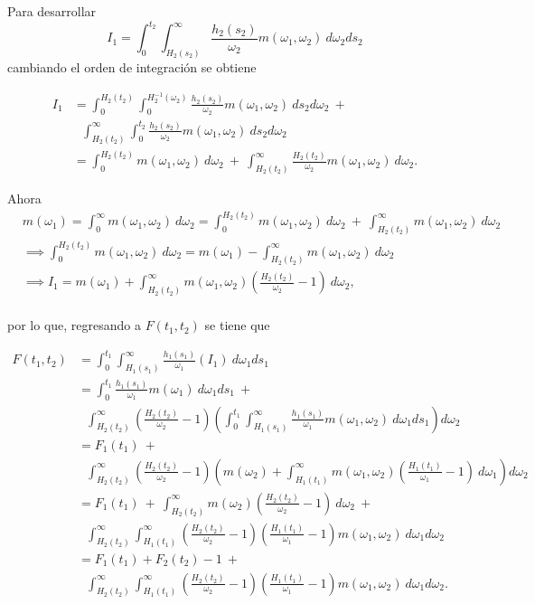 \documentclass[11pt,a4paper]{article}
\begin{document}
\begin{appendices}
Para desarrollar $$I_1 = \int_0^{t_2} \int_{H_2(s_2)}^\infty \frac{h_2(s_2)}{\omega_2} m(\omega_1, \omega_2) \ d\omega_2 ds_2$$ cambiando el orden de integración se obtiene

\begin{align*}
I_1 &= \int_0^{H_2(t_2)}\int_0^{H_2^{-1}(\omega_2)} \frac{h_2(s_2)}{\omega_2}m(\omega_1, \omega_2) \ ds_2 d\omega_2 \ +\\
& \ \ \ \int_{H_2(t_2)}^\infty \int_0^{t_2} \frac{h_2(s_2)}{\omega_2}m(\omega_1, \omega_2) \ ds_2 d\omega_2\\
&= \int_0^{H_2(t_2)} m(\omega_1, \omega_2) \ d\omega_2 \ + \ \int_{H_2(t_2)}^\infty \frac{H_2(t_2)}{\omega_2}m(\omega_1, \omega_2) \ d\omega_2.
\end{align*}

Ahora
\begin{align*}
&m(\omega_1) = \int_0^\infty m(\omega_1, \omega_2) \ d\omega_2 = \int_0^{H_2(t_2)} m(\omega_1, \omega_2) \ d\omega_2 \ + \ \int_{H_2(t_2)}^\infty m(\omega_1, \omega_2) \ d\omega_2\\
&\implies \int_0^{H_2(t_2)} m(\omega_1, \omega_2) \ d\omega_2 = m(\omega_1) - \int_{H_2(t_2)}^\infty m(\omega_1, \omega_2) \ d\omega_2\\
&\implies I_1 = m(\omega_1) + \int_{H_2(t_2)}^\infty m(\omega_1, \omega_2) \left( \frac{H_2(t_2)}{\omega_2}-1\right) \ d\omega_2,\\
\end{align*}

por lo que, regresando a $F(t_1, t_2)$ se tiene que

\begin{align*}
F(t_1, t_2) &= \int_0^{t_1} \int_{H_1(s_1)}^\infty \frac{h_1(s_1)}{\omega_1}\left( I_1 \right) \ d\omega_1 ds_1\\
&= \int_0^{t_1} \frac{h_1(s_1)}{\omega_1}m(\omega_1) \ d\omega_1 ds_1 \ +\\ & \ \ \ \int_{H_2(t_2)}^\infty \left(\frac{H_2(t_2)}{\omega_2}-1 \right) \left(\int_0^{t_1}\int_{H_1(s_1)}^\infty \frac{h_1(s_1)}{\omega_1}m(\omega_1, \omega_2) \ d\omega_1 ds_1 \right) d\omega_2\\
&= F_1(t_1) \ + \\
& \ \ \ \int_{H_2(t_2)}^\infty \left(\frac{H_2(t_2)}{\omega_2}-1 \right)\left(m(\omega_2) + \int_{H_1(t_1)}^\infty m(\omega_1, \omega_2) \left(\frac{H_1(t_1)}{\omega_1}-1 \right) \ d\omega_1 \right) d\omega_2\\
&= F_1(t_1) \ + \ \int_{H_2(t_2)}^\infty m(\omega_2) \left( \frac{H_2(t_2)}{\omega_2}-1 \right) \ d\omega_2 \ +\\
& \ \ \ \int_{H_2(t_2)}^\infty\int_{H_1(t_1)}^\infty \left(\frac{H_2(t_2)}{\omega_2}-1\right)\left(\frac{H_1(t_1)}{\omega_1}-1\right) m(\omega_1, \omega_2) \ d\omega_1 d\omega_2\\
&= F_1(t_1) + F_2(t_2) - 1 \ +\\
& \ \ \ \int_{H_2(t_2)}^\infty\int_{H_1(t_1)}^\infty \left(\frac{H_2(t_2)}{\omega_2}-1\right)\left(\frac{H_1(t_1)}{\omega_1}-1\right) m(\omega_1, \omega_2) \ d\omega_1 d\omega_2.\\
\end{align*}


\end{appendices}
\end{document}
